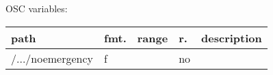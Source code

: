 \begin{snugshade}
{\footnotesize
\label{osctab:glabsensoremergency}
OSC variables:
\nopagebreak

\begin{tabularx}{\textwidth}{llllX}
\hline
path & fmt. & range & r. & description\\
\hline
/.../noemergency & f &  & no & \\
\hline
\end{tabularx}
}
\end{snugshade}
